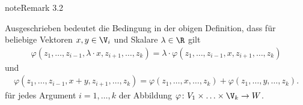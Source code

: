 \documentclass[letterpaper,10pt,english]{jupyterBook}
\begin{document}
\begin{sphinxadmonition}{note}{Remark 3.2}



\sphinxAtStartPar
Ausgeschrieben bedeutet die Bedingung in der obigen Definition, dass für beliebige Vektoren \(x,y\in \V_i\) und Skalare \(\lambda \in \R\) gilt
\begin{equation*}
\begin{split}\varphi(z_1,\ldots,z_{i-1},\lambda \cdot x, z_{i+1},\ldots,z_k) = \lambda \cdot \varphi(z_1,\ldots,z_{i-1}, x, z_{i+1}, \ldots,z_k)\end{split}
\end{equation*}
\sphinxAtStartPar
und
\begin{equation*}
\begin{split}\varphi(z_1,\ldots,z_{i-1},x+y,z_{i+1},\ldots,z_k) = \varphi(z_1,\ldots,x,\ldots,z_k) + \varphi(z_1,\ldots,y,\ldots,z_k).\end{split}
\end{equation*}
\sphinxAtStartPar
für jedes Argument \(i = 1,\ldots,k\) der Abbildung \(\varphi \colon V_1 \times \ldots \times \V_k \rightarrow W\).
\end{sphinxadmonition}
\end{document}
